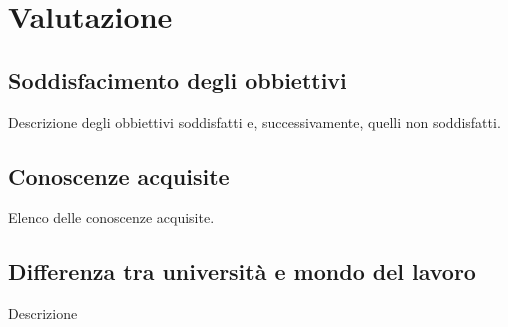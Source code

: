 
\chapter{Valutazione}
\label{cap:resoconto-stage}

\section{Soddisfacimento degli obbiettivi}

Descrizione degli obbiettivi soddisfatti e, successivamente, quelli non soddisfatti.

\section{Conoscenze acquisite}
Elenco delle conoscenze acquisite.

\section{Differenza tra università e mondo del lavoro}

Descrizione 
